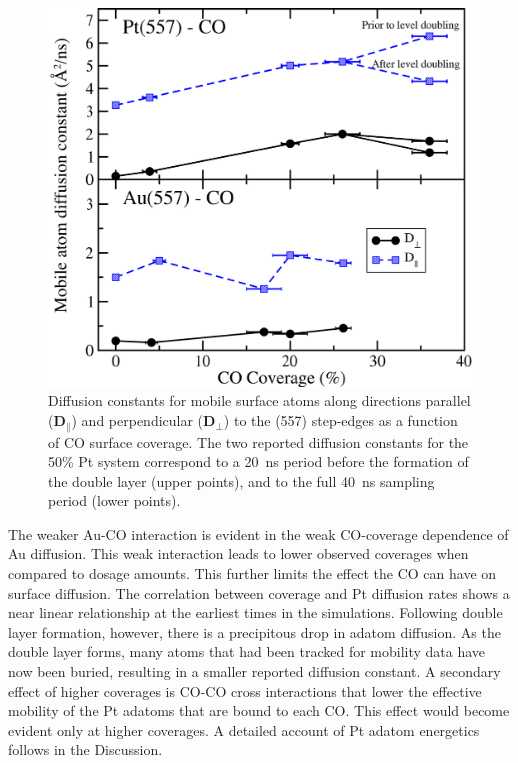 \begin{figure}[p!]
\includegraphics[width=\linewidth]{../figures/chap2/diffusion.pdf}
\caption{Diffusion constants for mobile surface atoms along directions
  parallel ($\mathbf{D}_{\parallel}$) and perpendicular
  ($\mathbf{D}_{\perp}$) to the (557) step-edges as a function of CO
  surface coverage.  The two reported diffusion constants for the 50\%
  Pt system correspond to a 20~ns period before the formation of the
  double layer (upper points), and to the full 40~ns sampling period
  (lower points).}
\label{fig:diff}
\end{figure}

The weaker Au-CO interaction is evident in the weak CO-coverage 
dependence of Au diffusion. This weak interaction leads to lower 
observed coverages when compared to dosage amounts. This further 
limits the effect the CO can have on surface diffusion. The correlation 
between coverage and Pt diffusion rates shows a near linear relationship 
at the earliest times in the simulations. Following double layer formation, 
however, there is a precipitous drop in adatom diffusion. As the double 
layer forms, many atoms that had been tracked for mobility data have 
now been buried, resulting in a smaller reported diffusion constant. A
secondary effect of higher coverages is CO-CO cross interactions that
lower the effective mobility of the Pt adatoms that are bound to each CO.
This effect would become evident only at higher coverages. A detailed
account of Pt adatom energetics follows in the Discussion.
 
